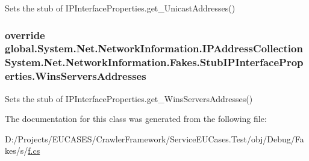 Sets the stub of I\-P\-Interface\-Properties.\-get\-\_\-\-Unicast\-Addresses()

\hypertarget{class_system_1_1_net_1_1_network_information_1_1_fakes_1_1_stub_i_p_interface_properties_a205039c32a3b98ed6ba7ea3c01d39517}{
\subsubsection[{Wins\-Servers\-Addresses}]{\setlength{\rightskip}{0pt plus 5cm}override global.\-System.\-Net.\-Network\-Information.\-I\-P\-Address\-Collection System.\-Net.\-Network\-Information.\-Fakes.\-Stub\-I\-P\-Interface\-Properties.\-Wins\-Servers\-Addresses\hspace{0.3cm}{\ttfamily [get]}}}\label{class_system_1_1_net_1_1_network_information_1_1_fakes_1_1_stub_i_p_interface_properties_a205039c32a3b98ed6ba7ea3c01d39517}


Sets the stub of I\-P\-Interface\-Properties.\-get\-\_\-\-Wins\-Servers\-Addresses()



The documentation for this class was generated from the following file\-:\begin{DoxyCompactItemize}
\item 
D\-:/\-Projects/\-E\-U\-C\-A\-S\-E\-S/\-Crawler\-Framework/\-Service\-E\-U\-Cases.\-Test/obj/\-Debug/\-Fakes/s/\hyperlink{s_2f_8cs}{f.\-cs}\end{DoxyCompactItemize}
